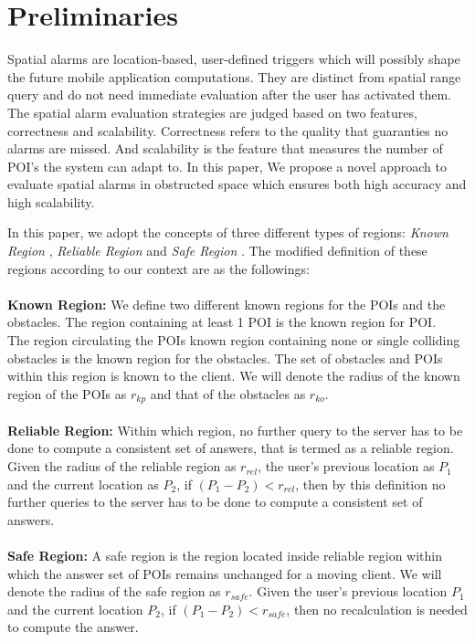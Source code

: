 \documentclass{sig-alternate}
\begin{document}
\section{Preliminaries}
Spatial alarms are location-based, user-defined triggers which will possibly shape the future mobile application computations. They are distinct from spatial range query and do not need immediate evaluation after the user has activated them. The spatial alarm evaluation strategies are judged based on two features, correctness and scalability. Correctness refers to the quality that guaranties no alarms are missed. And scalability is the feature that measures the number of POI's the system can adapt to. 
In this paper, We propose a novel approach to evaluate spatial alarms in obstructed space which ensures both high accuracy and high scalability.

In this paper, we adopt the concepts of three different types of regions: \textit{Known Region} \cite{Obst1}, \textit{Reliable Region} \cite{Obst1} and \textit{Safe Region} \cite{Obst1}. The modified definition of these regions according to our context are as the followings:\\ \\

\textbf{Known Region:} We define two different known regions for the POIs and the obstacles. The region containing at least 1 POI is the known region for POI.\\
The region circulating the POIs known region containing none or single colliding obstacles is the known region for the obstacles. The set of obstacles and POIs within this region is known to the client. 
We will denote the radius of the known region of the POIs as $r_{kp}$ and that of the obstacles as $r_{ko}$.\\ \\


\textbf{Reliable Region:} Within which region, no further query to the server has to be done to compute a consistent set of answers, that is termed as a reliable region. Given the radius of the reliable region as $r_{rel}$, the user's previous location as $P_1$ and the current location as $P_2$, if $(P_1 - P_2) < r_{rel}$, then by this definition no further queries to the server has to be done to compute a consistent set of answers. \\ \\


\textbf{Safe Region:} A safe region is the region located inside reliable region within which the answer set of POIs remains unchanged for a moving client. We will denote the radius of the safe region as $r_{safe}$. Given the user's previous location $P_1$ and the current location $P_2$, if $(P_1 - P_2) < r_{safe}$, then no recalculation is needed to compute the answer.
\\ \\
\end{document}
